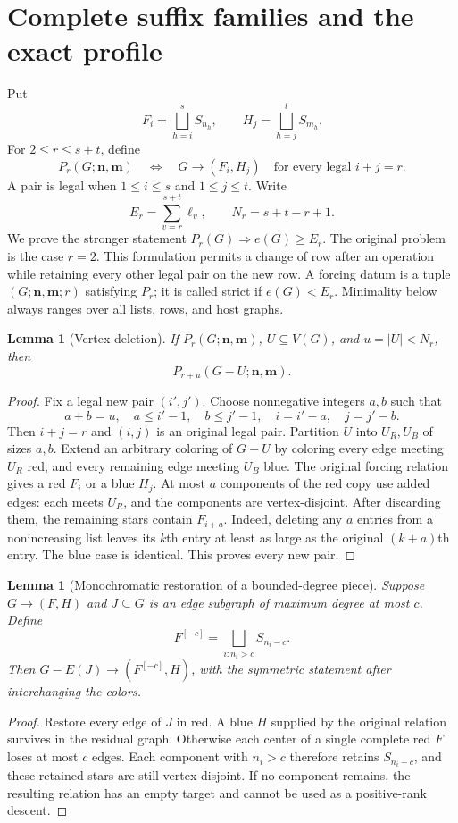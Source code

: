 \documentclass[11pt,a4paper]{article}
\newcommand{\nn}{\mathbf n}\newcommand{\mm}{\mathbf m}
\newcommand{\sq}{\bigsqcup}
\newtheorem{lemma}[theorem]{Lemma}
\theoremstyle{definition}
\begin{document}
\section{Complete suffix families and the exact profile}\label{sec:suffixes}
Put
\[
F_i=\sq_{h=i}^{s}S_{n_h},\qquad H_j=\sq_{h=j}^{t}S_{m_h}.
\]
For $2\le r\le s+t$, define
\begin{equation}\label{eq:Pr}
P_r(G;\nn,\mm)\quad\Longleftrightarrow\quad
G\to(F_i,H_j)\quad\text{for every legal }i+j=r.
\end{equation}
A pair is legal when $1\le i\le s$ and $1\le j\le t$. Write
\[
E_r=\sum_{v=r}^{s+t}\ell_v,\qquad N_r=s+t-r+1.
\]
We prove the stronger statement $P_r(G)\Rightarrow e(G)\ge E_r$. The original problem is the case $r=2$. This formulation permits a change of row after an operation while retaining every other legal pair on the new row.
A forcing datum is a tuple $(G;\nn,\mm;r)$ satisfying $P_r$; it is called strict if $e(G)<E_r$. Minimality below always ranges over all lists, rows, and host graphs.

\begin{lemma}[Vertex deletion]\label{lem:vertices}
If $P_r(G;\nn,\mm)$, $U\subseteq V(G)$, and $u=|U|<N_r$, then
\[
P_{r+u}(G-U;\nn,\mm).
\]
\end{lemma}
\begin{proof}
Fix a legal new pair $(i',j')$. Choose nonnegative integers $a,b$ such that
\[
a+b=u,\quad a\le i'-1,\quad b\le j'-1,\quad
i=i'-a,\quad j=j'-b.
\]
Then $i+j=r$ and $(i,j)$ is an original legal pair. Partition $U$ into $U_R,U_B$ of sizes $a,b$. Extend an arbitrary coloring of $G-U$ by coloring every edge meeting $U_R$ red, and every remaining edge meeting $U_B$ blue.
The original forcing relation gives a red $F_i$ or a blue $H_j$. At most $a$ components of the red copy use added edges: each meets $U_R$, and the components are vertex-disjoint. After discarding them, the remaining stars contain $F_{i+a}$. Indeed, deleting any $a$ entries from a nonincreasing list leaves its $k$th entry at least as large as the original $(k+a)$th entry. The blue case is identical. This proves every new pair.
\end{proof}

\begin{lemma}[Monochromatic restoration of a bounded-degree piece]\label{lem:erasure}
Suppose $G\to(F,H)$ and $J\subseteq G$ is an edge subgraph of maximum degree at most $c$. Define
\[
F^{[-c]}=\sq_{i:n_i>c}S_{n_i-c}.
\]
Then $G-E(J)\to(F^{[-c]},H)$, with the symmetric statement after interchanging the colors.
\end{lemma}
\begin{proof}
Restore every edge of $J$ in red. A blue $H$ supplied by the original relation survives in the residual graph. Otherwise each center of a single complete red $F$ loses at most $c$ edges. Each component with $n_i>c$ therefore retains $S_{n_i-c}$, and these retained stars are still vertex-disjoint. If no component remains, the resulting relation has an empty target and cannot be used as a positive-rank descent.
\end{proof}
\end{document}
